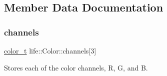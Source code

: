 \subsection{Member Data Documentation}
\mbox{\label{structlife_1_1_color_acbb18a06aeb0d05c8e9477a25fbd32bf}} 
\subsubsection{\texorpdfstring{channels}{channels}}
{\footnotesize\ttfamily \mbox{\hyperlink{structlife_1_1_color_ab392ce7ebd8204f1447c7e296dde9a17}{color\+\_\+t}} life\+::\+Color\+::channels\mbox{[}3\mbox{]}}



Stores each of the color channels, R, G, and B. 

